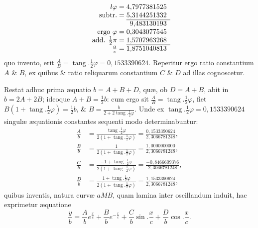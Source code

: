 \[\begin{array}{r@{\;=\;}r}
l\varphi&4{,}7977381525\\
\text{subtr.}&5{,}3144251332\\\cline{2-2}
\multicolumn{1}{r}{}&9{,}483130193\\
\text{ergo }\varphi&0{,}3043077545\\
\text{add. }\frac12\pi&1{,}5707963268\\\cline{2-2}
\frac ac&1{,}8751040813
\end{array}\]
quo invento, erit $\frac AB=\operatorname{tang}.\frac12\varphi=0{,}1533390624$. Reperitur ergo ratio constantium $A$ \& $B$, ex quibus \& ratio reliquarum constantium $C$ \& $D$ ad illas cognoscetur.

Restat adhuc prima æquatio $b=A+B+D$, quæ, ob $D=A+B$, abit in $b=2A+2B$; ideoque $A+B=\frac12b$: cum ergo sit $\frac AB=\operatorname{tang}.\frac12\varphi$, fiet $B(1+\operatorname{tang}.\frac12\varphi)=\frac12b$, \& $B=\frac b{2+2\operatorname{tang}.\frac12\varphi}$. Unde ex $\operatorname{tang}.\frac12\varphi=0{,}1533390624$ singulæ æquationis constantes sequenti modo determinabuntur:
\[\begin{aligned}
\frac Ab&=\frac{\operatorname{tang}.\frac12\varphi}{2(1+\operatorname{tang}.\frac12\varphi)}=\frac{0{,}1533390624}{2{,}3066781248},\\
\frac Bb&=\frac1{2(1+\operatorname{tang}.\frac12\varphi)}=\frac{1{,}0000000000}{2{,}3066781248},\\
\frac Cb&=\frac{-1+\operatorname{tang}.\frac12\varphi}{2(1+\operatorname{tang}.\frac12\varphi)}=\frac{-0{,}8466609376}{2{,}3066781248},\\
\frac Db&=\frac{1+\operatorname{tang}.\frac12\varphi}{2(1+\operatorname{tang}.\frac12\varphi)}=\frac{1{,}1533390624}{2{,}3066781248},
\end{aligned}\]
quibus inventis, natura curvæ $aMB$, quam lamina inter oscillandum induit, hac exprimetur æquatione
\[\frac yb=\frac Abe^{\frac xc}+\frac Bbe^{-\frac xc}+\frac Cb\sin.\frac xc+\frac Db\cos.\frac xc.\]

